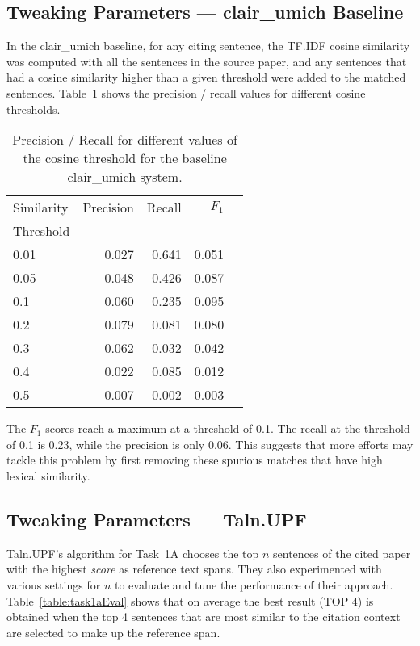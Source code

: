 \documentclass[11pt]{article}
\begin{document}
\subsection{Tweaking Parameters --- clair\_umich Baseline}
In the clair\_umich baseline, for any citing sentence, the TF.IDF
cosine similarity was computed with all the sentences in the source
paper, and any sentences that had a cosine similarity higher than a
given threshold were added to the matched
sentences. Table~\ref{tab:clairumichbaseline} shows the precision /
recall values for different cosine thresholds.
\begin{table}[h]
  \centering
  \begin{tabular}{|l|r|r|r|r|}
  	\hline
	Similarity & Precision & Recall & $F_1$ \\
	Threshold & & & \\
	\hline
	0.01 & 0.027 & 0.641 & 0.051\\
	0.05 & 0.048 & 0.426 & 0.087\\
	0.1 & 0.060 & 0.235 & 0.095\\
	0.2 & 0.079 & 0.081 & 0.080\\
	0.3 & 0.062 & 0.032 & 0.042\\
	0.4 & 0.022 & 0.085 & 0.012\\
	0.5 & 0.007 &  0.002 & 0.003\\
	\hline
  \end{tabular}
  \caption{Precision / Recall for different values of the cosine threshold 
  			for the baseline clair\_umich system.}
  \label{tab:clairumichbaseline}
\end{table}

The $F_1$ scores reach a maximum at a threshold of 0.1. The recall at
the threshold of 0.1 is 0.23, while the precision is only 0.06. This
suggests that more efforts may tackle this problem by first removing
these spurious matches that have high lexical similarity.

\subsection{Tweaking Parameters --- Taln.UPF}
Taln.UPF's algorithm for Task~1A chooses the top $n$ sentences of the
cited paper with the highest \textit{score} as reference text
spans. They also experimented with various settings for $n$ to
evaluate and tune the performance of their approach.
Table~\ref{table:task1aEval} shows that on average the best result
(TOP 4) is obtained when the top 4 sentences that are most similar to the
citation context are selected to make up the reference span.
\end{document}
